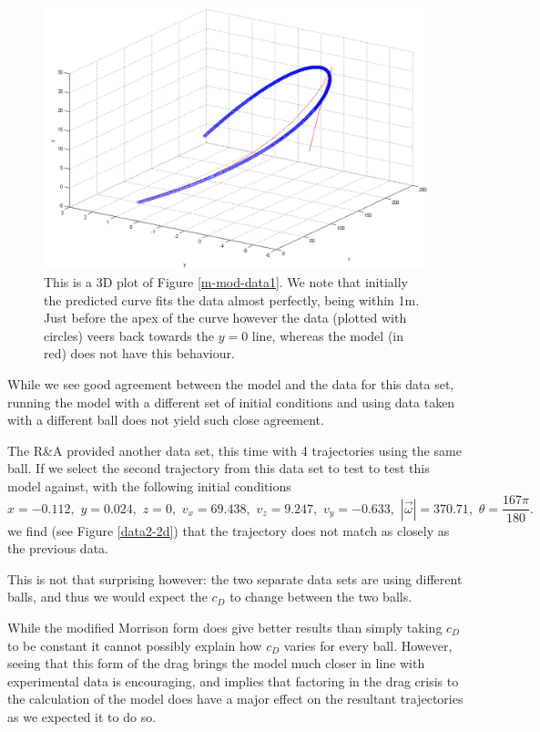 \begin{figure}[h]
\centering
\includegraphics[scale=0.5]{../images/m-mod-data1-3d.png}
\caption[Model with using the modified Morrison form for $c_D$ in 3D.]{This is a 3D plot of Figure \ref{m-mod-data1}.
We note that initially the predicted curve fits the data almost perfectly, being within 1m. Just before
the apex of the curve however the data (plotted with circles) veers back towards the $y=0$ line, whereas
the model (in red) does not have this behaviour.}
\end{figure}

While we see good agreement between the model and the data for this data set, running the model with
a different set of initial conditions and using data taken with a different ball does not yield such
close agreement.

The R\&A provided another data set, this time with 4 trajectories using the same ball. If we select
the second trajectory from this data set to test to test this model against, with the following 
initial conditions
\[
x = -0.112, \,\, y = 0.024, \,\, z = 0, \,\, v_x = 69.438, \,\, v_z = 9.247, \,\, v_y = -0.633, \,\,
|\vec{\omega}| = 370.71,\,\, \theta = \frac{167\pi}{180} .
\]
we find (see Figure \ref{data2-2d}) that the trajectory does not match as closely as the previous data.

This is not that surprising however: the two separate data sets are using different balls, and thus
we would expect the $c_D$ to change between the two balls.

While the modified Morrison form does give better results than simply taking $c_D$ to be constant
it cannot possibly explain how $c_D$ varies for every ball. However, seeing that this form of the drag
brings the model much closer in line with experimental data is encouraging, and implies that factoring
in the drag crisis to the calculation of the model does have a major effect on the resultant trajectories
as we expected it to do so.

